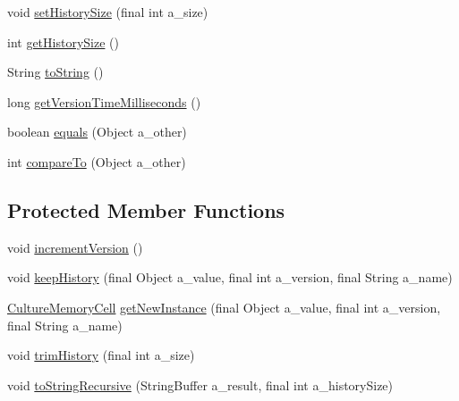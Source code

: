 \begin{DoxyCompactItemize}
\item 
void \hyperlink{classorg_1_1jgap_1_1distr_1_1_culture_memory_cell_ab869b14ee95d1943d8726151b11d3dd4}{set\-History\-Size} (final int a\-\_\-size)
\item 
int \hyperlink{classorg_1_1jgap_1_1distr_1_1_culture_memory_cell_aa84f028dc699a714bddbcc71e5da33db}{get\-History\-Size} ()
\item 
String \hyperlink{classorg_1_1jgap_1_1distr_1_1_culture_memory_cell_a6d16482e95c3d40f67511f43bc9f57dd}{to\-String} ()
\item 
long \hyperlink{classorg_1_1jgap_1_1distr_1_1_culture_memory_cell_a082f698809508dd8a54519260a993393}{get\-Version\-Time\-Milliseconds} ()
\item 
boolean \hyperlink{classorg_1_1jgap_1_1distr_1_1_culture_memory_cell_a9fcbad174c7a386d6527306d86621fef}{equals} (Object a\-\_\-other)
\item 
int \hyperlink{classorg_1_1jgap_1_1distr_1_1_culture_memory_cell_aad6d47cc667193be5a75d4f3bcf3e675}{compare\-To} (Object a\-\_\-other)
\end{DoxyCompactItemize}
\subsection*{Protected Member Functions}
\begin{DoxyCompactItemize}
\item 
void \hyperlink{classorg_1_1jgap_1_1distr_1_1_culture_memory_cell_a99315b0f898dc5b7f4a13a674902ab33}{increment\-Version} ()
\item 
void \hyperlink{classorg_1_1jgap_1_1distr_1_1_culture_memory_cell_a1d7a89c09d12333a0a5846c5c49890eb}{keep\-History} (final Object a\-\_\-value, final int a\-\_\-version, final String a\-\_\-name)
\item 
\hyperlink{classorg_1_1jgap_1_1distr_1_1_culture_memory_cell}{Culture\-Memory\-Cell} \hyperlink{classorg_1_1jgap_1_1distr_1_1_culture_memory_cell_aaaeed06d7e64648fe6b12b753caec986}{get\-New\-Instance} (final Object a\-\_\-value, final int a\-\_\-version, final String a\-\_\-name)
\item 
void \hyperlink{classorg_1_1jgap_1_1distr_1_1_culture_memory_cell_a21efff9174d3988134aadea5a33b23ce}{trim\-History} (final int a\-\_\-size)
\item 
void \hyperlink{classorg_1_1jgap_1_1distr_1_1_culture_memory_cell_a256d4a332bbba1449c483cdbeee6fdb3}{to\-String\-Recursive} (String\-Buffer a\-\_\-result, final int a\-\_\-history\-Size)
\end{DoxyCompactItemize}
